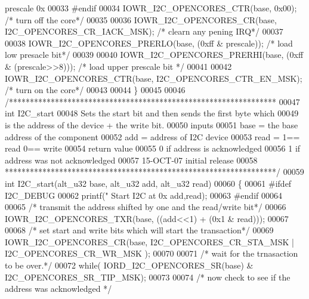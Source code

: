 \begin{DoxyCode}
{       prescale 0x%
00033 \textcolor{preprocessor}{#endif}
00034   IOWR_I2C_OPENCORES_CTR(base, 0x00); \textcolor{comment}{/* turn off the core*/}
00035 
00036   IOWR_I2C_OPENCORES_CR(base, I2C_OPENCORES_CR_IACK_MSK); \textcolor{comment}{/* clearn any pening IRQ*/}
00037 
00038   IOWR_I2C_OPENCORES_PRERLO(base, (0xff & prescale));  \textcolor{comment}{/* load low presacle bit*/}
00039 
00040   IOWR_I2C_OPENCORES_PRERHI(base, (0xff & (prescale>>8)));  \textcolor{comment}{/* load upper prescale bit */}
00041 
00042   IOWR_I2C_OPENCORES_CTR(base, I2C_OPENCORES_CTR_EN_MSK); \textcolor{comment}{/* turn on the core*/}
00043 
00044 \}
00045 
00046 \textcolor{comment}{/****************************************************************}
00047 \textcolor{comment}{int I2C\_start}
00048 \textcolor{comment}{            Sets the start bit and then sends the first byte which}
00049 \textcolor{comment}{            is the address of the device + the write bit.}
00050 \textcolor{comment}{inputs}
00051 \textcolor{comment}{      base = the base address of the component}
00052 \textcolor{comment}{      add = address of I2C device}
00053 \textcolor{comment}{      read =  1== read    0== write}
00054 \textcolor{comment}{return value}
00055 \textcolor{comment}{       0 if address is acknowledged}
00056 \textcolor{comment}{       1 if address was not acknowledged}
00057 \textcolor{comment}{15-OCT-07 initial release}
00058 \textcolor{comment}{*****************************************************************/}
00059 \textcolor{keywordtype}{int} I2C_start(alt_u32 base, alt_u32 add, alt_u32 read)
00060 \{
00061 \textcolor{preprocessor}{#ifdef  I2C\_DEBUG}
00062         printf(\textcolor{stringliteral}{" Start  I2C at 0x%
      add,read);
00063 \textcolor{preprocessor}{#endif}
00064 
00065           \textcolor{comment}{/* transmit the address shifted by one and the read/write bit*/}
00066   IOWR_I2C_OPENCORES_TXR(base, ((add<<1) + (0x1 & read)));
00067 
00068           \textcolor{comment}{/* set start and write  bits which will start the transaction*/}
00069   IOWR_I2C_OPENCORES_CR(base, I2C_OPENCORES_CR_STA_MSK | I2C_OPENCORES_CR_WR_MSK );
00070 
00071           \textcolor{comment}{/* wait for the trnasaction to be over.*/}
00072   \textcolor{keywordflow}{while}( IORD_I2C_OPENCORES_SR(base) & I2C_OPENCORES_SR_TIP_MSK);
00073 
00074          \textcolor{comment}{/* now check to see if the address was acknowledged */}
}}
\end{DoxyCode}
